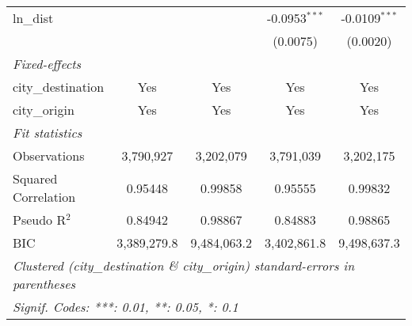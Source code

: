 \begin{tabular}{lcccc}
   ln\_dist                          &                &                & -0.0953$^{***}$ & -0.0109$^{***}$\\   
                                     &                &                & (0.0075)        & (0.0020)\\   
   \midrule
   \emph{Fixed-effects}\\
   city\_destination                 & Yes            & Yes            & Yes             & Yes\\  
   city\_origin                      & Yes            & Yes            & Yes             & Yes\\  
   \midrule
   \emph{Fit statistics}\\
   Observations                      & 3,790,927      & 3,202,079      & 3,791,039       & 3,202,175\\  
   Squared Correlation               & 0.95448        & 0.99858        & 0.95555         & 0.99832\\  
   Pseudo R$^2$                      & 0.84942        & 0.98867        & 0.84883         & 0.98865\\  
   BIC                               & 3,389,279.8    & 9,484,063.2    & 3,402,861.8     & 9,498,637.3\\  
   \midrule \midrule
   \multicolumn{5}{l}{\emph{Clustered (city\_destination \& city\_origin) standard-errors in parentheses}}\\
   \multicolumn{5}{l}{\emph{Signif. Codes: ***: 0.01, **: 0.05, *: 0.1}}\\
\end{tabular}
\par\endgroup



